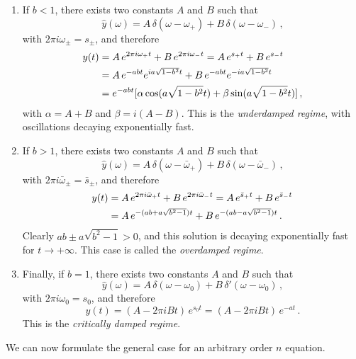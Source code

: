 \begin{enumerate}
  \item If $b<1$, there exists two constants $A$ and $B$ such that
    \begin{equation}
      \hat{y}(\omega)=A\,\delta(\omega-\omega_+)+B\,\delta(\omega-\omega_-)\,,
    \end{equation}
    with $2\pi i\omega_{\pm}=s_\pm$, and therefore
    \begin{align}
      y(t)&=A\,e^{2\pi i\omega_+ t}+B\,e^{2\pi i\omega_- t}
      =A\,e^{s_+ t}+B\,e^{s_- t}
      \notag\\
      &=A\,e^{-abt}e^{ia\sqrt{1-b^2}t}+B\,e^{-abt}e^{-ia\sqrt{1-b^2}t}\notag\\
      &=e^{-abt}[\alpha\cos(a\sqrt{1-b^2}t)+\beta\sin(a\sqrt{1-b^2}t)]\,,
      \label{eq:ode2-damped-under}
    \end{align}
    with $\alpha=A+B$ and $\beta=i(A-B)$. This is the \emph{underdamped regime}, with
    oscillations decaying exponentially fast.
  \item If $b>1$, there exists two constants $A$ and $B$ such that
    \begin{equation}
      \hat{y}(\omega)=A\,\delta(\omega-\bar{\omega}_+)+B\,\delta(\omega-\bar{\omega}_-)\,,
    \end{equation}
    with $2\pi i\bar{\omega}_{\pm}=\bar{s}_\pm$, and therefore
    \begin{align}
      y(t)&=A\,e^{2\pi i\bar{\omega}_+ t}+B\,e^{2\pi i\bar{\omega}_- t}
      =A\,e^{\bar{s}_+ t}+B\,e^{\bar{s}_- t}\notag\\
      &=A\,e^{-(ab+a\sqrt{b^2-1})t}+B\,e^{-(ab-a\sqrt{b^2-1})t}\,.
      \label{eq:ode2-damped-over}
    \end{align}
    Clearly $ab\pm a\sqrt{b^2-1}>0$, and this solution is decaying exponentially fast for
    $t\to+\infty$. This case is called the \emph{overdamped regime}.
  \item Finally, if $b=1$, there exists two constants $A$ and $B$ such that
    \begin{equation}
      \hat{y}(\omega)=A\,\delta(\omega-\omega_0)+B\,\delta'(\omega-\omega_0)\,,
    \end{equation}
    with $2\pi i\omega_{0}=s_0$, and therefore
    \begin{equation}
      y(t)=(A-2\pi i Bt)\,e^{s_0 t}
      =(A-2\pi i Bt)\,e^{-at}\,.
      \label{eq:ode2-damped-crit}
    \end{equation}
    This is the \emph{critically damped regime}.
\end{enumerate}
We can now formulate the general case for an arbitrary order $n$ equation.
